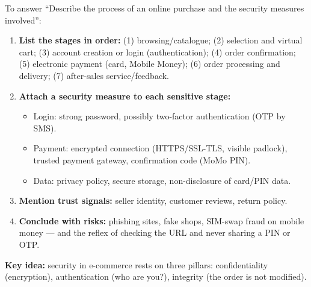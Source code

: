 \documentclass[11pt]{article}
\newcommand{\cle}[1]{{\popxbold\color{popdark}#1}}
\begin{document}
\begin{methode}
To answer ``Describe the process of an online purchase and the security measures involved'':
\begin{enumerate}
\item \textbf{List the stages in order:} (1) browsing/catalogue; (2) selection and virtual cart; (3) account creation or login (authentication); (4) order confirmation; (5) electronic payment (card, Mobile Money); (6) order processing and delivery; (7) after-sales service/feedback.
\item \textbf{Attach a security measure to each sensitive stage:}
\begin{itemize}
\item Login: strong password, possibly two-factor authentication (OTP by SMS).
\item Payment: encrypted connection (\cle{HTTPS}/SSL-TLS, visible padlock), trusted payment gateway, confirmation code (MoMo PIN).
\item Data: privacy policy, secure storage, non-disclosure of card/PIN data.
\end{itemize}
\item \textbf{Mention trust signals:} seller identity, customer reviews, return policy.
\item \textbf{Conclude with risks:} phishing sites, fake shops, SIM-swap fraud on mobile money — and the reflex of checking the URL and never sharing a PIN or OTP.
\end{enumerate}
\textbf{Key idea:} security in e-commerce rests on three pillars: \cle{confidentiality} (encryption), \cle{authentication} (who are you?), \cle{integrity} (the order is not modified).
\end{methode}
\end{document}
